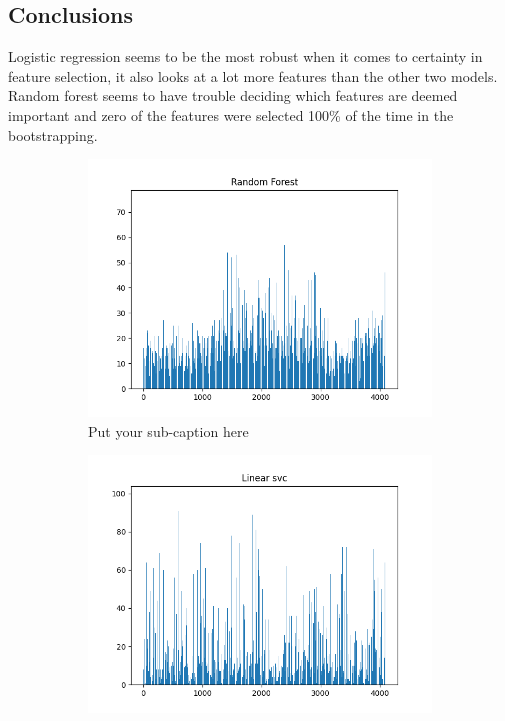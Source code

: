 \documentclass{article}
\begin{document}
\subsection{Conclusions}
Logistic regression seems to be the most robust when it comes to certainty in feature selection, it also looks at a lot more features than the other two models. Random forest seems to have trouble deciding which features are deemed important and zero of the features were selected 100\% of the time in the bootstrapping. 
\begin{figure}[ht]
\begin{subfigure}{.33\textwidth}
  \centering
  \includegraphics[width=1\linewidth]{1b/Figure_2_bra.png}  
  \caption{Put your sub-caption here}
  \label{RandForSel}
\end{subfigure}
\begin{subfigure}{.33\textwidth}
  \centering
  \includegraphics[width=1\linewidth]{1b/Figure_3_bra.png}  

\end{subfigure}
\end{figure}
\end{document}
